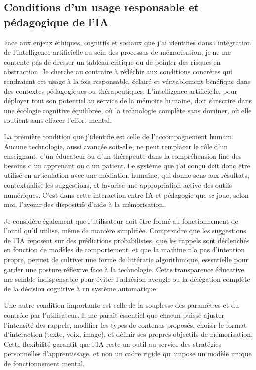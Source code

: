 \documentclass[11pt,a4paper]{report}
\begin{document}
\subsection{Conditions d’un usage responsable et pédagogique de l’IA}

Face aux enjeux éthiques, cognitifs et sociaux que j’ai identifiés dans l’intégration de l’intelligence artificielle au sein des processus de mémorisation, je ne me contente pas de dresser un tableau critique ou de pointer des risques en abstraction. Je cherche au contraire à réfléchir aux conditions concrètes qui rendraient cet usage à la fois responsable, éclairé et véritablement bénéfique dans des contextes pédagogiques ou thérapeutiques. L’intelligence artificielle, pour déployer tout son potentiel au service de la mémoire humaine, doit s’inscrire dans une écologie cognitive équilibrée, où la technologie complète sans dominer, où elle soutient sans effacer l’effort mental.

La première condition que j’identifie est celle de l’accompagnement humain. Aucune technologie, aussi avancée soit-elle, ne peut remplacer le rôle d’un enseignant, d’un éducateur ou d’un thérapeute dans la compréhension fine des besoins d’un apprenant ou d’un patient. Le système que j’ai conçu doit donc être utilisé en articulation avec une médiation humaine, qui donne sens aux résultats, contextualise les suggestions, et favorise une appropriation active des outils numériques. C’est dans cette interaction entre IA et pédagogie que se joue, selon moi, l’avenir des dispositifs d’aide à la mémorisation.

Je considère également que l’utilisateur doit être formé au fonctionnement de l’outil qu’il utilise, même de manière simplifiée. Comprendre que les suggestions de l’IA reposent sur des prédictions probabilistes, que les rappels sont déclenchés en fonction de modèles de comportement, et que la machine n’a pas d’intention propre, permet de cultiver une forme de littératie algorithmique, essentielle pour garder une posture réflexive face à la technologie. Cette transparence éducative me semble indispensable pour éviter l’adhésion aveugle ou la délégation complète de la décision cognitive à un système automatique.

Une autre condition importante est celle de la souplesse des paramètres et du contrôle par l’utilisateur. Il me paraît essentiel que chacun puisse ajuster l’intensité des rappels, modifier les types de contenus proposés, choisir le format d’interaction (texte, voix, image), et définir ses propres objectifs de mémorisation. Cette flexibilité garantit que l’IA reste un outil au service des stratégies personnelles d’apprentissage, et non un cadre rigide qui impose un modèle unique de fonctionnement mental.
\end{document}
